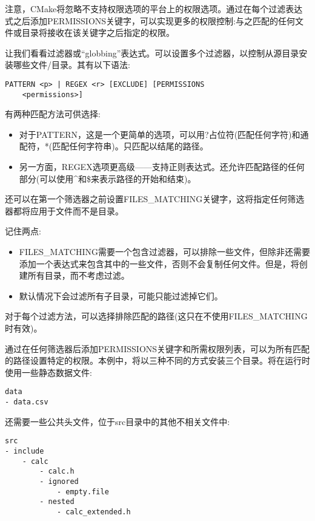 注意，CMake将忽略不支持权限选项的平台上的权限选项。通过在每个过滤表达式之后添加PERMISSIONS关键字，可以实现更多的权限控制:与之匹配的任何文件或目录将接收在该关键字之后指定的权限。

让我们看看过滤器或“globbing”表达式。可以设置多个过滤器，以控制从源目录安装哪些文件/目录。其有以下语法:

\begin{lstlisting}[style=styleCMake]
PATTERN <p> | REGEX <r> [EXCLUDE] [PERMISSIONS
	<permissions>]
\end{lstlisting}

有两种匹配方法可供选择:

\begin{itemize}
\item 
对于PATTERN，这是一个更简单的选项，可以用?占位符(匹配任何字符)和通配符，*(匹配任何字符串)。只匹配以结尾的路径。

\item 
另一方面，REGEX选项更高级——支持正则表达式。还允许匹配路径的任何部分(可以使用\^{}和\$来表示路径的开始和结束)。
\end{itemize}

还可以在第一个筛选器之前设置FILES\_MATCHING关键字，这将指定任何筛选器都将应用于文件而不是目录。

记住两点:

\begin{itemize}
\item 
FILES\_MATCHING需要一个包含过滤器，可以排除一些文件，但除非还需要添加一个表达式来包含其中的一些文件，否则不会复制任何文件。但是，将创建所有目录，而不考虑过滤。

\item 
默认情况下会过滤所有子目录，可能只能过滤掉它们。
\end{itemize}

对于每个过滤方法，可以选择排除匹配的路径(这只在不使用FILES\_MATCHING时有效)。

通过在任何筛选器后添加PERMISSIONS关键字和所需权限列表，可以为所有匹配的路径设置特定的权限。本例中，将以三种不同的方式安装三个目录。将在运行时使用一些静态数据文件:

\begin{lstlisting}[style=stylePython]
data
- data.csv
\end{lstlisting}

还需要一些公共头文件，位于src目录中的其他不相关文件中:

\begin{lstlisting}[style=stylePython]
src
- include
	- calc
		- calc.h
		- ignored
			- empty.file
		- nested
			- calc_extended.h
\end{lstlisting}

